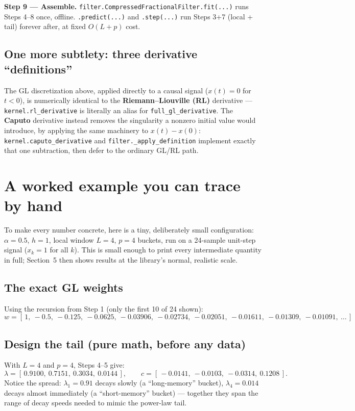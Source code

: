 \documentclass[11pt]{article}
\begin{document}
\begin{stepbox}
\textbf{Step 9 --- Assemble.} \texttt{filter.CompressedFractionalFilter.fit(...)} runs Steps 4--8 once, offline. \texttt{.predict(...)} and \texttt{.step(...)} run Steps 3+7 (local + tail) forever after, at fixed $O(L+p)$ cost.
\end{stepbox}

\subsection{One more subtlety: three derivative ``definitions''}
The GL discretization above, applied directly to a causal signal ($x(t){=}0$ for $t{<}0$), is numerically identical to the \textbf{Riemann--Liouville (RL)} derivative --- \texttt{kernel.rl\_derivative} is literally an alias for \texttt{full\_gl\_derivative}. The \textbf{Caputo} derivative instead removes the singularity a nonzero initial value would introduce, by applying the same machinery to $x(t)-x(0)$: \texttt{kernel.caputo\_derivative} and \texttt{filter.\_apply\_definition} implement exactly that one subtraction, then defer to the ordinary GL/RL path.

\section{A worked example you can trace by hand}

To make every number concrete, here is a tiny, deliberately small configuration: $\alpha=0.5$, $h=1$, local window $L=4$, $p=4$ buckets, run on a 24-sample unit-step signal ($x_k=1$ for all $k$). This is small enough to print every intermediate quantity in full; Section~5 then shows results at the library's normal, realistic scale.

\subsection{The exact GL weights}
Using the recursion from Step 1 (only the first 10 of 24 shown):
\[
w = [\,1,\ -0.5,\ -0.125,\ -0.0625,\ -0.03906,\ -0.02734,\ -0.02051,\ -0.01611,\ -0.01309,\ -0.01091,\ \dots\,]
\]

\subsection{Design the tail (pure math, before any data)}
With $L=4$ and $p=4$, Steps 4--5 give:
\[
\lambda = [\,0.9100,\ 0.7151,\ 0.3034,\ 0.0144\,], \qquad
c = [\,-0.0141,\ -0.0103,\ -0.0314,\ 0.1208\,].
\]
Notice the spread: $\lambda_1{=}0.91$ decays slowly (a ``long-memory'' bucket), $\lambda_4{=}0.014$ decays almost immediately (a ``short-memory'' bucket) --- together they span the range of decay speeds needed to mimic the power-law tail.
\end{document}
